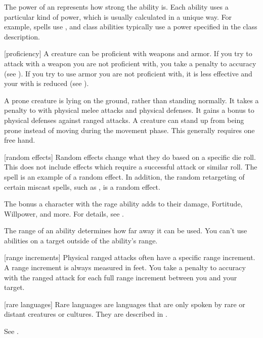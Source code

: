  The power of an  represents how strong the ability is.
Each ability uses a particular kind of power, which is usually calculated in a unique way.
For example, spells use , and class abilities typically use a power specified in the class description.

[proficiency] A creature can be proficient with weapons and armor.
If you try to attack with a weapon you are not proficient with, you take a  penalty to accuracy (see ).
If you try to use armor you are not proficient with, it is less effective and your  with  is reduced (see ).

 A prone creature is lying on the ground, rather than standing normally.
It takes a  penalty to  with physical melee attacks and physical defenses.
It gains a  bonus to physical defenses against ranged attacks.
A creature can stand up from being prone instead of moving during the movement phase.
This generally requires one free hand.

[random effects] Random effects change what they do based on a specific die roll.
This does not include effects which require a successful attack or similar roll.
The  spell is an example of a random effect.
In addition, the random retargeting of certain miscast spells, such as , is a random effect.

 The bonus a character with the rage ability adds to their damage, Fortitude, Willpower, and more.
For details, see .

 The range of an ability determines how far away it can be used.
You can't use abilities on a target outside of the ability's range.

[range increments] Physical ranged attacks often have a specific range increment.
A range increment is always measured in feet.
You take a  penalty to accuracy with the ranged attack for each full range increment between you and your target.

[rare languages] Rare languages are languages that are only spoken by rare or distant creatures or cultures.
They are described in .

 See .

